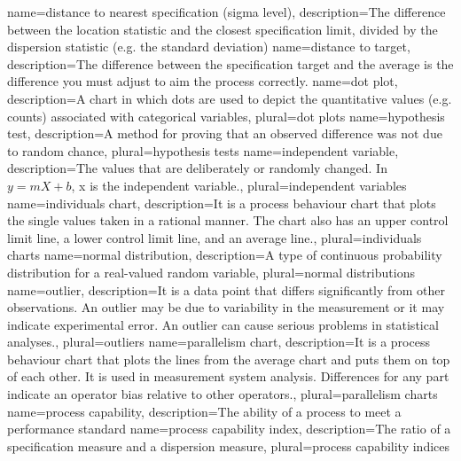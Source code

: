 {
    name={distance to nearest specification (sigma level)},
    description={The difference between the location statistic and the closest specification limit, divided by the dispersion statistic (e.g. the standard deviation)}
}
{
    name={distance to target},
    description={The difference between the specification target and the average is the difference you must adjust to aim the process correctly.}
}
{
    name={dot plot},
    description={A chart in which dots are used to depict the quantitative values (e.g. counts) associated with categorical variables},
    plural={dot plots}
}
{
    name={hypothesis test},
    description={A method for proving that an observed difference was not due to random chance},
    plural={hypothesis tests}
}
{
    name={independent variable},
    description={The values that are deliberately or randomly changed. In $y = mX + b$, x is the independent variable.},
    plural={independent variables}
}
{
    name={individuals chart},
    description={It is a process behaviour chart that plots the single values taken in a rational manner. The chart also has an upper control limit line, a lower control limit line, and an average line.},
    plural={individuals charts}
}
{
    name={normal distribution},
    description={A type of continuous probability distribution for a real-valued random variable},
    plural={normal distributions}
}
{
    name={outlier},
    description={It is a data point that differs significantly from other observations. An outlier may be due to variability in the measurement or it may indicate experimental error. An outlier can cause serious problems in statistical analyses.},
    plural={outliers}
}
{
    name={parallelism chart},
    description={It is a process behaviour chart that plots the lines from the average chart and puts them on top of each other. It is used in measurement system analysis. Differences for any part indicate an operator bias relative to other operators.},
    plural={parallelism charts}
}
{
    name={process capability},
    description={The ability of a process to meet a performance standard}
}
{
    name={process capability index},
    description={The ratio of a specification measure and a dispersion measure},
    plural={process capability indices}
}
